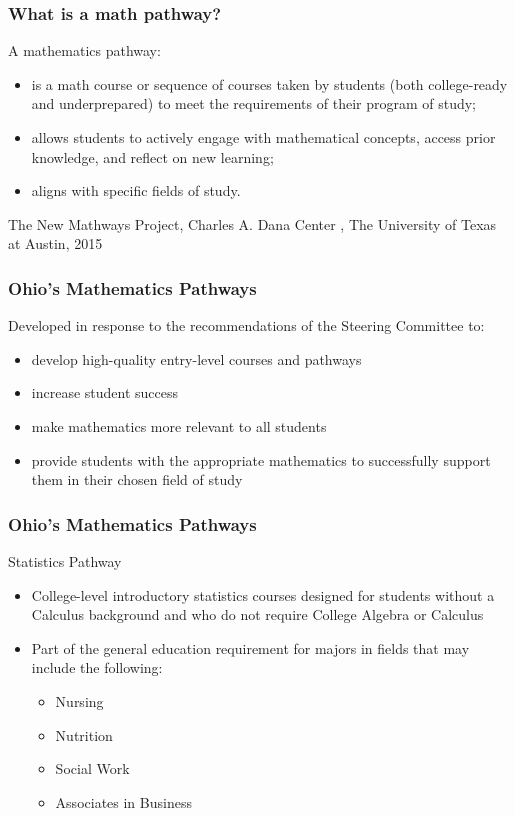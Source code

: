 \documentclass[14pt]{beamer}
\newcounter{a}
\newcounter{b}
\begin{document}
\begin{frame}
  \frametitle{What is a math pathway?}

  A mathematics pathway:
\begin{itemize}
  \item is a math course or sequence of courses taken by students (both college-ready and underprepared) to meet the requirements of their program of study;
  \item allows students to actively engage with mathematical concepts, access prior knowledge, and reflect on new learning;
  \item aligns with specific fields of study.
\end{itemize}

The New Mathways Project, Charles A. Dana Center , The University of Texas at Austin, 2015
\end{frame}

\begin{frame}
  \frametitle{Ohio's Mathematics Pathways}

  Developed in response to the recommendations of the Steering Committee to:

  \begin{itemize}
  \item develop high-quality entry-level courses and pathways
  \item increase student success
  \item make mathematics more relevant to all students
  \item provide students with the appropriate mathematics to successfully support them in their chosen field of study
  \end{itemize}
  
\end{frame}

\begin{frame}
  \frametitle{Ohio's Mathematics Pathways}

  Statistics Pathway %

  \begin{itemize}
  \item College-level introductory statistics courses designed for students without a Calculus background and who do not require College Algebra or Calculus
  \item Part of the general education requirement for majors in fields that may include the following:
    \begin{itemize}
      \item Nursing
      \item Nutrition
      \item Social Work
      \item Associates in Business
    \end{itemize}
  \end{itemize}
\end{frame}
\end{document}

